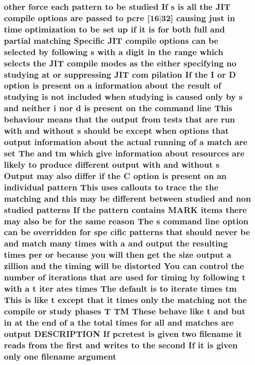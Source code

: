 \subsubsection[{\texorpdfstring{argument}{argument}}]{ other force each {\bf pattern} {\bf to} {\bf be} {\bf studied} If {\bf s} {\bf is} {\bf all} the J\+IT {\bf compile} {\bf options} {\bf are} passed {\bf to} {\bf pcre} \mbox{[}16$\vert$32\mbox{]} causing just {\bf in} {\bf time} optimization {\bf to} {\bf be} {\bf set} up {\bf if} {\bf it} {\bf is} for both full and {\bf partial} {\bf matching} Specific J\+IT {\bf compile} {\bf options} {\bf can} {\bf be} {\bf selected} by following {\bf s} {\bf with} {\bf a} digit {\bf in} the range {\bf which} selects the J\+IT {\bf compile} {\bf modes} {\bf as} the either {\bf specifying} no {\bf studying} at {\bf or} suppressing J\+IT com pilation If the {\bf I} {\bf or} {\bf D} {\bf option} {\bf is} {\bf present} {\bf on} {\bf a} information about the {\bf result} {\bf of} {\bf studying} {\bf is} {\bf not} {\bf included} when {\bf studying} {\bf is} caused only by {\bf s} and neither {\bf i} nor {\bf d} {\bf is} {\bf present} {\bf on} the {\bf command} {\bf line} This behaviour means that the {\bf output} {\bf from} {\bf tests} that {\bf are} {\bf run} {\bf with} and without {\bf s} should {\bf be} {\bf except} when {\bf options} that {\bf output} information about the actual running {\bf of} {\bf a} {\bf match} {\bf are} {\bf set} The and {\bf tm} {\bf which} give information about resources {\bf are} likely {\bf to} produce different {\bf output} {\bf with} and without {\bf s} Output may also differ {\bf if} the {\bf C} {\bf option} {\bf is} {\bf present} {\bf on} an individual {\bf pattern} This uses callouts {\bf to} trace the the {\bf matching} and {\bf this} may {\bf be} different between {\bf studied} and non {\bf studied} {\bf patterns} If the {\bf pattern} {\bf contains} M\+A\+RK items there may also {\bf be} for the same {\bf reason} The {\bf s} {\bf command} {\bf line} {\bf option} {\bf can} {\bf be} overridden for spe cific {\bf patterns} that should never {\bf be} and {\bf match} many {\bf times} {\bf with} {\bf a} and {\bf output} the resulting {\bf times} per {\bf or} because you will then get the {\bf size} {\bf output} {\bf a} zillion and the timing will {\bf be} distorted You {\bf can} control the {\bf number} {\bf of} iterations that {\bf are} {\bf used} for timing by following {\bf t} {\bf with} {\bf a} {\bf t} {\bf iter} ates {\bf times} The {\bf default} {\bf is} {\bf to} iterate {\bf times} {\bf tm} This {\bf is} like {\bf t} {\bf except} that {\bf it} {\bf times} only the {\bf matching} {\bf not} the {\bf compile} {\bf or} {\bf study} phases {\bf T} TM These behave like {\bf t} and but {\bf in} at the {\bf end} {\bf of} {\bf a} the total {\bf times} for {\bf all} and {\bf matches} {\bf are} {\bf output} D\+E\+S\+C\+R\+I\+P\+T\+I\+ON If {\bf pcretest} {\bf is} {\bf given} two {\bf filename} {\bf it} reads {\bf from} the {\bf first} and writes {\bf to} the {\bf second} If {\bf it} {\bf is} {\bf given} only one {\bf filename} argument}\hypertarget{pcretest_8txt_a3d5995b3342f68be7fa8992ba579aed0}{}\label{pcretest_8txt_a3d5995b3342f68be7fa8992ba579aed0}
